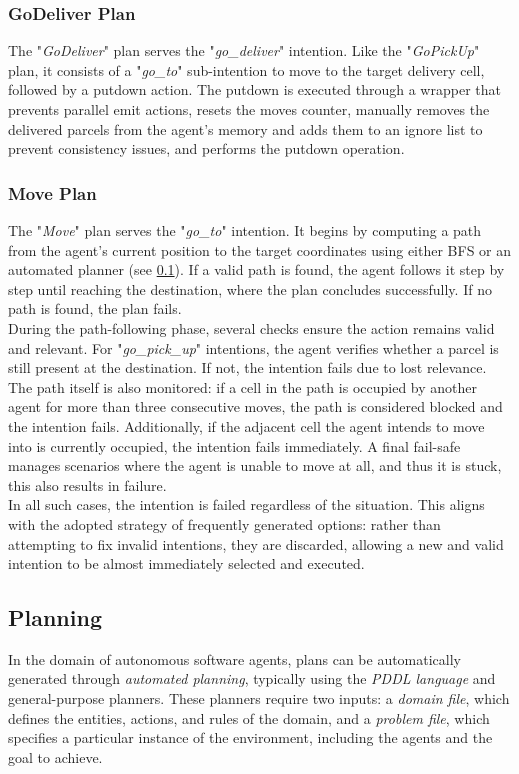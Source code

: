         \subsubsection{GoDeliver Plan}
            The "\textit{GoDeliver}" plan serves the "\textit{go\_deliver}" intention. Like the "\textit{GoPickUp}" plan, it consists of a "\textit{go\_to}" sub-intention to move to the target delivery cell, followed by a putdown action. The putdown is executed through a wrapper that prevents parallel emit actions, resets the moves counter, manually removes the delivered parcels from the agent's memory and adds them to an ignore list to prevent consistency issues, and performs the putdown operation.

        \subsubsection{Move Plan}
            The "\textit{Move}" plan serves the "\textit{go\_to}" intention. It begins by computing a path from the agent's current position to the target coordinates using either BFS or an automated planner (see \ref{planning}). If a valid path is found, the agent follows it step by step until reaching the destination, where the plan concludes successfully. If no path is found, the plan fails.
            \medskip\\
            During the path-following phase, several checks ensure the action remains valid and relevant. For "\textit{go\_pick\_up}" intentions, the agent verifies whether a parcel is still present at the destination. If not, the intention fails due to lost relevance. The path itself is also monitored: if a cell in the path is occupied by another agent for more than three consecutive moves, the path is considered blocked and the intention fails. Additionally, if the adjacent cell the agent intends to move into is currently occupied, the intention fails immediately. A final fail-safe manages scenarios where the agent is unable to move at all, and thus it is stuck, this also results in failure.
            \medskip\\
            In all such cases, the intention is failed regardless of the situation. This aligns with the adopted strategy of frequently generated options: rather than attempting to fix invalid intentions, they are discarded, allowing a new and valid intention to be almost immediately selected and executed.

    \subsection{Planning}\label{planning}
        In the domain of autonomous software agents, plans can be automatically generated through \textit{automated planning}, typically using the \textit{PDDL language} and general-purpose planners. These planners require two inputs: a \textit{domain file}, which defines the entities, actions, and rules of the domain, and a \textit{problem file}, which specifies a particular instance of the environment, including the agents and the goal to achieve.

